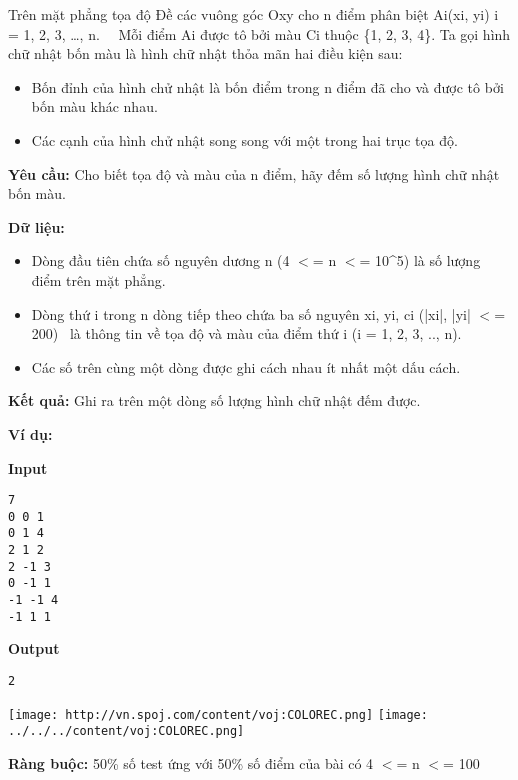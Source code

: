 

Trên mặt phẳng tọa độ Đề các vuông góc Oxy cho n điểm phân biệt Ai(xi, yi) i = 1, 2, 3, …, n.   Mỗi điểm Ai được tô bởi màu Ci thuộc \{1, 2, 3, 4\}. Ta gọi hình chữ nhật bốn màu là hình chữ nhật thỏa mãn hai điều kiện sau:
\begin{itemize}
	\item Bốn đỉnh của hình chử nhật là bốn điểm trong n điểm đã cho và được tô bởi bốn màu khác nhau.
	\item Các cạnh của hình chử nhật song song với một trong hai trục tọa độ.
\end{itemize}

\textbf{Yêu cầu: } Cho biết tọa độ và màu của n điểm, hãy đếm số lượng hình chữ nhật bốn màu.

\textbf{Dữ liệu: }
\begin{itemize}
	\item Dòng đầu tiên chứa số nguyên dương n (4 $<$= n $<$= 10\textasciicircum5) là số lượng điểm trên mặt phẳng.
	\item Dòng thứ i trong n dòng tiếp theo chứa ba số nguyên xi, yi, ci (|xi|, |yi| $<$= 200)  là thông tin về tọa độ và màu của điểm thứ i (i = 1, 2, 3, .., n).
	\item Các số trên cùng một dòng được ghi cách nhau ít nhất một dấu cách.
\end{itemize}

\textbf{Kết quả: } Ghi ra trên một dòng số lượng hình chữ nhật đếm được.

\textbf{Ví dụ: }

\textbf{Input }
\begin{verbatim}
7
0 0 1
0 1 4
2 1 2
2 -1 3
0 -1 1
-1 -1 4
-1 1 1\end{verbatim}

\textbf{Output}
\begin{verbatim}
2\end{verbatim}


\texttt{[image: http://vn.spoj.com/content/voj:COLOREC.png]}
\texttt{[image: ../../../content/voj:COLOREC.png]}

\textbf{Ràng buộc: } 50\% số test ứng với 50\% số điểm của bài có 4 $<$= n $<$= 100